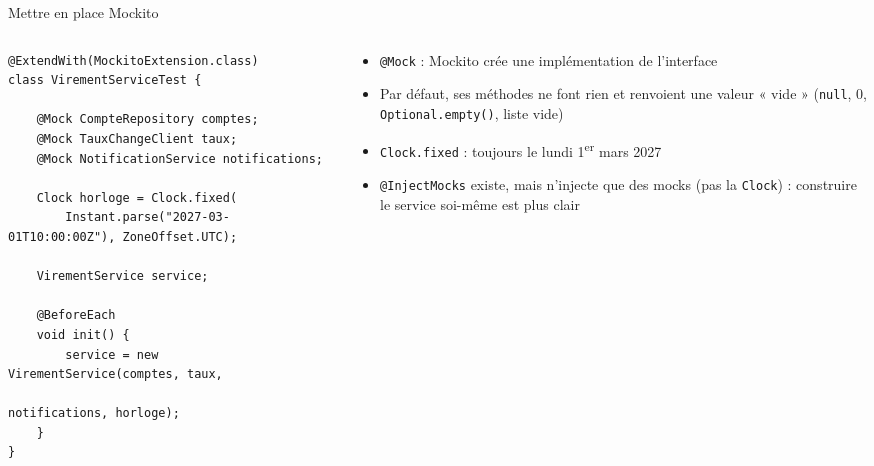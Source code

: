 \documentclass[aspectratio=169,10pt]{beamer}
\begin{document}
\begin{frame}[fragile]{Mettre en place Mockito}
  \begin{columns}[T]
    \begin{column}{0.6\textwidth}
\begin{lstlisting}[basicstyle=\lstcode\scriptsize]
@ExtendWith(MockitoExtension.class)
class VirementServiceTest {

    @Mock CompteRepository comptes;
    @Mock TauxChangeClient taux;
    @Mock NotificationService notifications;

    Clock horloge = Clock.fixed(
        Instant.parse("2027-03-01T10:00:00Z"), ZoneOffset.UTC);

    VirementService service;

    @BeforeEach
    void init() {
        service = new VirementService(comptes, taux,
                                      notifications, horloge);
    }
}
\end{lstlisting}
    \end{column}
    \begin{column}{0.37\textwidth}
      \small
      \begin{itemize}
        \item \texttt{@Mock} : Mockito crée une implémentation de l'interface
        \item Par défaut, ses méthodes ne font rien et renvoient une valeur « vide » (\texttt{null}, 0, \texttt{Optional.empty()}, liste vide)
        \item \texttt{Clock.fixed} : toujours le lundi 1\textsuperscript{er} mars 2027
        \item \texttt{@InjectMocks} existe, mais n'injecte que des mocks (pas la \texttt{Clock}) : construire le service soi-même est plus clair
      \end{itemize}
    \end{column}
  \end{columns}
\end{frame}
\end{document}
